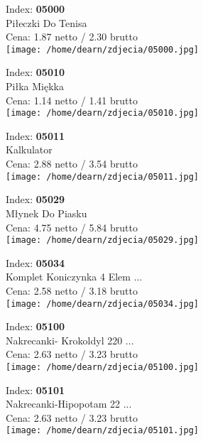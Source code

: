 {Index: \textbf{05000}\\
Piłeczki Do Tenisa\\
Cena: 1.87 netto / 2.30 brutto\\
  \texttt{[image: /home/dearn/zdjecia/05000.jpg]}}\newline\newline

{Index: \textbf{05010}\\
Piłka Miękka\\
Cena: 1.14 netto / 1.41 brutto\\
  \texttt{[image: /home/dearn/zdjecia/05010.jpg]}}\newline\newline

{Index: \textbf{05011}\\
Kalkulator\\
Cena: 2.88 netto / 3.54 brutto\\
  \texttt{[image: /home/dearn/zdjecia/05011.jpg]}}\newline\newline

{Index: \textbf{05029}\\
Młynek Do Piasku\\
Cena: 4.75 netto / 5.84 brutto\\
  \texttt{[image: /home/dearn/zdjecia/05029.jpg]}}\newline\newline

{Index: \textbf{05034}\\
Komplet Koniczynka 4 Elem ...\\
Cena: 2.58 netto / 3.18 brutto\\
  \texttt{[image: /home/dearn/zdjecia/05034.jpg]}}\newline\newline

{Index: \textbf{05100}\\
Nakrecanki- Krokoldyl 220 ...\\
Cena: 2.63 netto / 3.23 brutto\\
  \texttt{[image: /home/dearn/zdjecia/05100.jpg]}}\newline\newline

{Index: \textbf{05101}\\
Nakrecanki-Hipopotam   22 ...\\
Cena: 2.63 netto / 3.23 brutto\\
  \texttt{[image: /home/dearn/zdjecia/05101.jpg]}}\newline\newline

